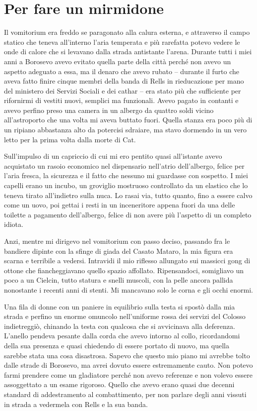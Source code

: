 \chapter{Per fare un mirmidone}

Il vomitorium era freddo se paragonato alla calura esterna, e attraverso
il campo statico che teneva all'interno l'aria temperata e più rarefatta
potevo vedere le onde di calore che si levavano dalla strada antistante
l'arena. Durante tutti i miei anni a Borosevo avevo evitato quella parte
della città perché non avevo un aspetto adeguato a essa, ma il denaro
che avevo rubato -- durante il furto che aveva fatto finire cinque
membri della banda di Rells in rieducazione per mano del ministero dei
Servizi Sociali e dei cathar -- era stato più che sufficiente per
rifornirmi di vestiti nuovi, semplici ma funzionali. Avevo pagato in
contanti e avevo perfino preso una camera in un albergo da quattro soldi
vicino all'astroporto che una volta mi aveva buttato fuori. Quella
stanza era poco più di un ripiano abbastanza alto da potercisi sdraiare,
ma stavo dormendo in un vero letto per la prima volta dalla morte di
Cat.

Sull'impulso di un capriccio di cui mi ero pentito quasi all'istante
avevo acquistato un rasoio economico nel dispensario nell'atrio
dell'albergo, felice per l'aria fresca, la sicurezza e il fatto che
nessuno mi guardasse con sospetto. I miei capelli erano un incubo, un
groviglio mostruoso controllato da un elastico che lo teneva tirato
all'indietro sulla nuca. Lo rasai via, tutto quanto, fino a essere calvo
come un uovo, poi gettai i resti in un inceneritore appena fuori da una
delle toilette a pagamento dell'albergo, felice di non avere più
l'aspetto di un completo idiota.

Anzi, mentre mi dirigevo nel vomitorium con passo deciso, passando fra
le bandiere dipinte con la sfinge di giada del Casato Mataro, la mia
figura era scarna e terribile a vedersi. Intravidi il mio riflesso
allungato sui massicci gong di ottone che fiancheggiavano quello spazio
affollato. Ripensandoci, somigliavo un poco a un Cielcin, tutto statura
e snelli muscoli, con la pelle ancora pallida nonostante i recenti anni
di stenti. Mi mancavano solo le corna e gli occhi enormi.

Una fila di donne con un paniere in equilibrio sulla testa si spostò
dalla mia strada e perfino un enorme omuncolo nell'uniforme rossa dei
servizi del Colosso indietreggiò, chinando la testa con qualcosa che si
avvicinava alla deferenza. L'anello pendeva pesante dalla corda che
avevo intorno al collo, ricordandomi della sua presenza e quasi
chiedendo di essere portato di nuovo, ma quella sarebbe stata una cosa
disastrosa. Sapevo che questo mio piano mi avrebbe tolto dalle strade di
Borosevo, ma avrei dovuto essere estremamente cauto. Non potevo farmi
prendere come un gladiatore perché non avevo referenze e non volevo
essere assoggettato a un esame rigoroso. Quello che avevo erano quasi
due decenni standard di addestramento al combattimento, per non parlare
degli anni vissuti in strada a vedermela con Rells e la sua banda.

